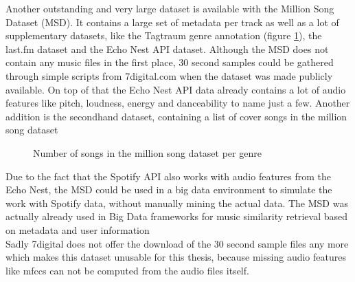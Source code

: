 Another outstanding and very large dataset is available with the Million Song Dataset (MSD)\cite{msd1}. 
It contains a large set of metadata per track as well as a lot of supplementary datasets, like the Tagtraum genre annotation (figure \ref{msddist})\cite{msd5}, the last.fm dataset\cite{msd2} and the Echo Nest API dataset\cite{msd3}. Although the MSD does not contain any music files in the first place, 30 second samples could be gathered through simple scripts from 7digital.com when the dataset was made publicly available. On top of that the Echo Nest API data already contains a lot of audio features like pitch, loudness, energy and danceability to name just a few.
Another addition is the secondhand dataset, containing a list of cover songs in the million song dataset\cite{msd6}
\begin{figure}[thpb]
	\centering
	\caption{Number of songs in the million song dataset per genre}
	\label{msddist}
\end{figure}
\FloatBarrier
Due to the fact that the Spotify API\cite{spotifyapi1} also works with audio features from the Echo Nest\cite{echonest1}, the MSD could be used in a big data environment to simulate the work with Spotify data, without manually mining the actual data. The MSD was actually already used in Big Data frameworks for music similarity retrieval based on metadata and user information\cite{msd4}\\
Sadly 7digital does not offer the download of the 30 second sample files any more which makes this dataset unusable for this thesis, because missing audio features like mfccs can not be computed from the audio files itself. 
